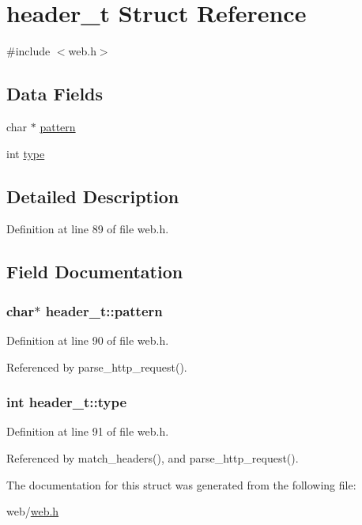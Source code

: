 \hypertarget{structheader__t}{}\section{header\+\_\+t Struct Reference}
\label{structheader__t}


{\ttfamily \#include $<$web.\+h$>$}

\subsection*{Data Fields}
\begin{DoxyCompactItemize}
\item 
char $\ast$ \hyperlink{structheader__t_a389d7564d1b1fd7b7ace82e15525e18c}{pattern}
\item 
int \hyperlink{structheader__t_a1f179d0a706f9ec29e1ac8ef9e67b8af}{type}
\end{DoxyCompactItemize}


\subsection{Detailed Description}


Definition at line 89 of file web.\+h.



\subsection{Field Documentation}
\subsubsection[{\texorpdfstring{pattern}{pattern}}]{\setlength{\rightskip}{0pt plus 5cm}char$\ast$ header\+\_\+t\+::pattern}\hypertarget{structheader__t_a389d7564d1b1fd7b7ace82e15525e18c}{}\label{structheader__t_a389d7564d1b1fd7b7ace82e15525e18c}


Definition at line 90 of file web.\+h.



Referenced by parse\+\_\+http\+\_\+request().

\subsubsection[{\texorpdfstring{type}{type}}]{\setlength{\rightskip}{0pt plus 5cm}int header\+\_\+t\+::type}\hypertarget{structheader__t_a1f179d0a706f9ec29e1ac8ef9e67b8af}{}\label{structheader__t_a1f179d0a706f9ec29e1ac8ef9e67b8af}


Definition at line 91 of file web.\+h.



Referenced by match\+\_\+headers(), and parse\+\_\+http\+\_\+request().



The documentation for this struct was generated from the following file\+:\begin{DoxyCompactItemize}
\item 
web/\hyperlink{web_8h}{web.\+h}\end{DoxyCompactItemize}
